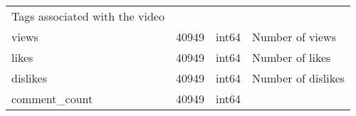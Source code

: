 \documentclass[11pt]{article}
\begin{document}
\begin{longtable}[]{@{}llll@{}}
\begin{minipage}[t]{0.25\columnwidth}
Tags associated with the video\strut
\end{minipage}\tabularnewline
\begin{minipage}[t]{0.32\columnwidth}\raggedright
views\strut
\end{minipage} & \begin{minipage}[t]{0.18\columnwidth}\raggedright
40949\strut
\end{minipage} & \begin{minipage}[t]{0.14\columnwidth}\raggedright
int64\strut
\end{minipage} & \begin{minipage}[t]{0.25\columnwidth}\raggedright
Number of views\strut
\end{minipage}\tabularnewline
\begin{minipage}[t]{0.32\columnwidth}\raggedright
likes\strut
\end{minipage} & \begin{minipage}[t]{0.18\columnwidth}\raggedright
40949\strut
\end{minipage} & \begin{minipage}[t]{0.14\columnwidth}\raggedright
int64\strut
\end{minipage} & \begin{minipage}[t]{0.25\columnwidth}\raggedright
Number of likes\strut
\end{minipage}\tabularnewline
\begin{minipage}[t]{0.32\columnwidth}\raggedright
dislikes\strut
\end{minipage} & \begin{minipage}[t]{0.18\columnwidth}\raggedright
40949\strut
\end{minipage} & \begin{minipage}[t]{0.14\columnwidth}\raggedright
int64\strut
\end{minipage} & \begin{minipage}[t]{0.25\columnwidth}\raggedright
Number of dislikes\strut
\end{minipage}\tabularnewline
\begin{minipage}[t]{0.32\columnwidth}\raggedright
comment\_count\strut
\end{minipage} & \begin{minipage}[t]{0.18\columnwidth}\raggedright
40949\strut
\end{minipage} & \begin{minipage}[t]{0.14\columnwidth}\raggedright
int64\strut
\end{minipage} & \begin{minipage}[t]{0.25\columnwidth}\raggedright

\end{minipage}
\end{longtable}
\end{document}

